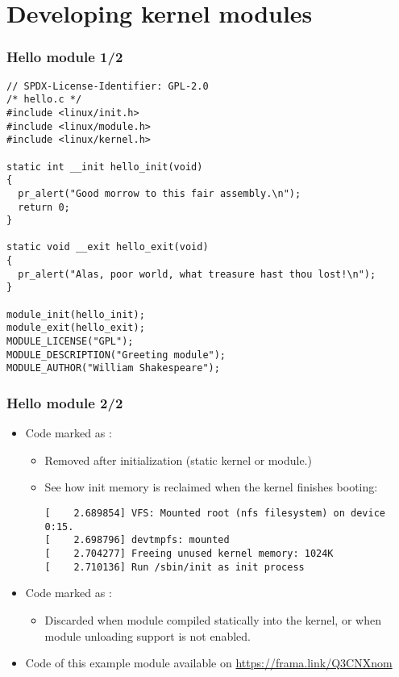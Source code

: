 \section{Developing kernel modules}

\begin{frame}[fragile]
  \frametitle{Hello module 1/2}
\begin{verbatim}
// SPDX-License-Identifier: GPL-2.0
/* hello.c */
#include <linux/init.h>
#include <linux/module.h>
#include <linux/kernel.h>

static int __init hello_init(void)
{
  pr_alert("Good morrow to this fair assembly.\n");
  return 0;
}

static void __exit hello_exit(void)
{
  pr_alert("Alas, poor world, what treasure hast thou lost!\n");
}

module_init(hello_init);
module_exit(hello_exit);
MODULE_LICENSE("GPL");
MODULE_DESCRIPTION("Greeting module");
MODULE_AUTHOR("William Shakespeare");
\end{verbatim}
\end{frame}

\begin{frame}[fragile]
  \frametitle{Hello module 2/2}
\begin{itemize}
\item Code marked as :
  \begin{itemize}
  \item Removed after initialization (static kernel or module.)
  \item See how init memory is reclaimed when the kernel finishes booting:
  \begin{verbatim}
[    2.689854] VFS: Mounted root (nfs filesystem) on device 0:15.
[    2.698796] devtmpfs: mounted
[    2.704277] Freeing unused kernel memory: 1024K
[    2.710136] Run /sbin/init as init process
  \end{verbatim}
  \end{itemize}
\item Code marked as :
  \begin{itemize}
  \item Discarded when module compiled statically into the kernel,
        or when module unloading support is not enabled.
  \end{itemize}
\item Code of this example module available on \url{https://frama.link/Q3CNXnom}
\end{itemize}
\end{frame}


